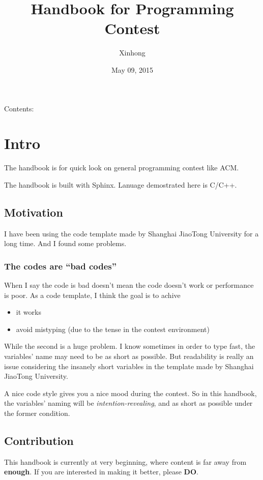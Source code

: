 \documentclass[letterpaper,10pt,english]{sphinxmanual}
\title{Handbook for Programming Contest}
\date{May 09, 2015}
\author{Xinhong}
\begin{document}
\maketitle
\tableofcontents
{}\label{index::doc}


Contents:


\chapter{Intro}
\label{intro:intro}\label{intro::doc}\label{intro:handbook-for-programming-contest}
The handbook is for quick look on general programming contest like ACM.

The handbook is built with Sphinx. Lanuage demostrated here is C/C++.


\section{Motivation}
\label{intro:motivation}
I have been using the code template made by Shanghai JiaoTong
University for a long time. And I found some problems.


\subsection{The codes are ``bad codes''}
\label{intro:the-codes-are-bad-codes}
When I say the code is bad doesn't mean the code doesn't work or performance is poor.
As a code template, I think the goal is to achive
\begin{itemize}
\item {} 
it works

\item {} 
avoid mistyping (due to the tense in the contest environment)

\end{itemize}

While the second is a huge problem. I know sometimes in order to type fast,
the variables' name may need to be as short as possible.
But readability is really an issue considering the insanely short variables
in the template made by Shanghai JiaoTong University.

A nice code style gives you a nice mood during the contest. So in this handbook,
the variables' naming will be \emph{intention-revealing}, and as short as possible under
the former condition.


\section{Contribution}
\label{intro:contribution}
This handbook is currently at very beginning, where content is far away from \textbf{enough}.
If you are interested in making it better, please \textbf{DO}.
\end{document}
